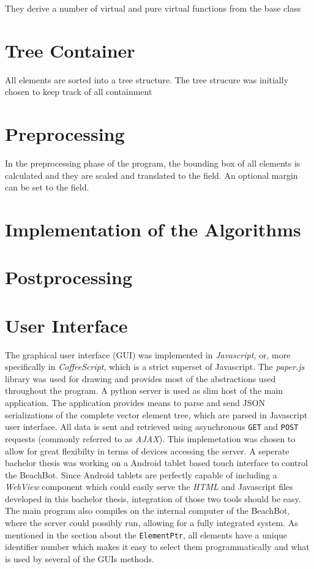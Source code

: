 They derive a number of virtual and pure virtual functions from the base class

\section{Tree Container}

All elements are sorted into a tree structure. The tree strucure was initially chosen to keep track of all containment 

\section{Preprocessing}

In the preprocessing phase of the program, the bounding box of all elements is calculated and they are scaled and translated to the field. An optional margin can be set to the field.

\section{Implementation of the Algorithms}
\section{Postprocessing}
\section{User Interface}

The graphical user interface (GUI) was implemented in \textit{Javascript}, or, more specifically in \textit{CoffeeScript}, which is a strict superset of Javascript. The \textit{paper.js} library was used for drawing and provides most of the abstractions used throughout the program. A python server is used as slim host of the main application. The application provides means to parse and send JSON serializations of the complete vector element tree, which are parsed in Javascript user interface. All data is sent and retrieved using asynchronous \texttt{GET} and \texttt{POST} requests (commonly referred to as \textit{AJAX}). This implemetation was chosen to allow for great flexibilty in terms of devices accessing the server. A seperate bachelor thesis was working on a Android tablet based touch interface to control the BeachBot. Since Android tablets are perfectly capable of including a \textit{WebView} component which could easily serve the \textit{HTML} and Javascript files developed in this bachelor thesis, integration of those two tools should be easy. The main program also compiles on the internal computer of the BeachBot, where the server could possibly run, allowing for a fully integrated system. As mentioned in the section about the \texttt{ElementPtr}, all elements have a unique identifier number which makes it easy to select them programmatically and what is used by several of the GUIs methods.

